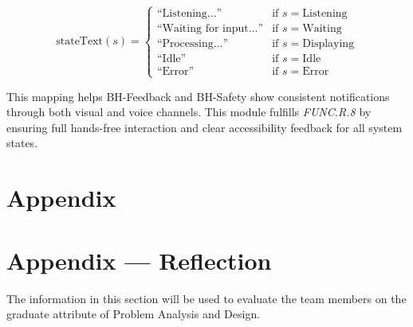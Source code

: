 \documentclass[12pt, titlepage]{article}
\begin{document}
\[
  \text{stateText}(s) =
  \begin{cases}
    \text{``Listening...''} & \text{if } s = \text{Listening}\\
    \text{``Waiting for input...''} & \text{if } s = \text{Waiting}\\
    \text{``Processing...''} & \text{if } s = \text{Displaying}\\
    \text{``Idle''} & \text{if } s = \text{Idle}\\
    \text{``Error''} & \text{if } s = \text{Error}
  \end{cases}
\]

\noindent
This mapping helps BH-Feedback and BH-Safety show consistent notifications
through both visual and voice channels. This module fulfills \textit{FUNC.R.8}
by ensuring full hands-free interaction and clear accessibility feedback for all
system states.

\newpage




\newpage

\section{Appendix} \label{Appendix}


\newpage{}

\section*{Appendix --- Reflection}


The information in this section will be used to evaluate the team members on the
graduate attribute of Problem Analysis and Design.


\end{document}
